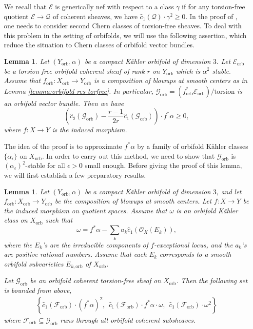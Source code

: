 \documentclass[12pt]{amsart}
\newcommand{\<}{\leq}
\def\>{\geq}
\def\mcO{\mathcal{O}}
\def\mcE{\mathcal{E}}
\def\mcF{\mathcal{F}}
\def\mcG{\mathcal{G}}
\newtheorem{lemma}[theorem]{Lemma}
\theoremstyle{remark}
\theoremstyle{definition}
\theoremstyle{definition}
\numberwithin{equation}{section}
\theoremstyle{definition}
\theoremstyle{definition}
\def\orb{\mathrm{orb}}
\begin{document}
We recall that $\mcE$ is generically nef with respect to a class $\gamma$ if  
for any  torsion-free quotient $\mcE \to \mathcal{Q}$ of coherent sheaves, we have $\hat{c}_1(\mathcal{Q})\cdot \gamma^2   \> 0$.
In the proof of \cite[Theorem 6.1]{Miy87}, one needs to consider second Chern classes of torsion-free sheaves. 
To deal with this problem in the setting of orbifolds, we will use  the following assertion, which reduce the situation to Chern classes of orbifold vector bundles. 






\begin{lemma}
\label{lemma:A-BG-inequality-orbifold}
Let $(Y_{\orb}, \alpha)$ be a compact K\"ahler orbifold of dimension $3$.   
Let $\mcE_{\orb}$  be a  torsion-free orbifold coherent sheaf of rank $r$  on $Y_{\orb}$ which is   $\alpha^{2}$-stable. 
Assume that $f_{\orb}\colon X_{\orb}\to Y_{\orb}$ is a  composition of blowups at smooth centers as in Lemma \ref{lemma:orbifold-res-torfree}. 
In particular,  
$\mcG_{\orb} = (f_{\orb}^*\mcE_{\orb})/{\mathrm{torsion}}$ is an orbifold vector bundle. 
Then we have 
\[
\left(\hat{c}_2(\mcG_{\orb}) - \frac{r-1}{2r}\hat{c}_1(\mcG_{\orb})\right)\cdot f^*\alpha \> 0, 
\] 
where $f\colon X\to Y$ is the induced morphism.
\end{lemma}

The idea of the proof is to approximate $f^*\alpha$ by a family of orbifold K\"ahler classes $\{\alpha_\epsilon\}$  on $X_{\orb}$. 
In order to carry out this method, we need to show that $\mcG_{\orb}$ is $(\alpha_\epsilon)^2$-stable for all $\epsilon>0$  small enough. Before giving the proof of this lemma, we will first establish a few preparatory results.




\begin{lemma}
\label{lemma:A-bounded-above} 
Let $(Y_{\orb}, \alpha)$ be a compact K\"ahler orbifold of dimension $3$,  and let $f_{\orb} \colon X_{\orb}\to Y_{\orb}$ be the composition of blowups at smooth centers. 
Let $f\colon X\to Y$ be the induced morphism on quotient spaces.
Assume that $\omega$ is an orbifold K\"ahler class on $X_{\orb}$ such that 
\[
\omega=f^*\alpha -\sum_k a_k \hat{c}_1( \mcO_{X}(E_k)),
\]
where the $E_k$'s are the irreducible components of $f$-exceptional locus, and the $a_k$'s are positive rational numbers.   
Assume that each $E_k$ corresponds to a smooth orbifold subvarieties $E_{k, \orb}$ of  $X_{\orb}$. 

Let $\mcG_{\orb}$  be  an orbifold coherent torsion-free sheaf on $X_{\orb}$. 
Then the following set  is bounded from above, 
\begin{eqnarray*}
    \left\{ 
\hat{c}_1(\mcF_{\orb}) \cdot (f^*\alpha)^2, \ \ 
\hat{c}_1(\mcF_{\orb}) \cdot f^*\alpha \cdot \omega,\  \ 
\hat{c}_1(\mcF_{\orb}) \cdot \omega^2 \right\} 
\end{eqnarray*}
where $\mcF_{\orb}
\subseteq \mcG_{\orb}$ runs through all orbifold coherent  subsheaves.
\end{lemma}
\end{document}
